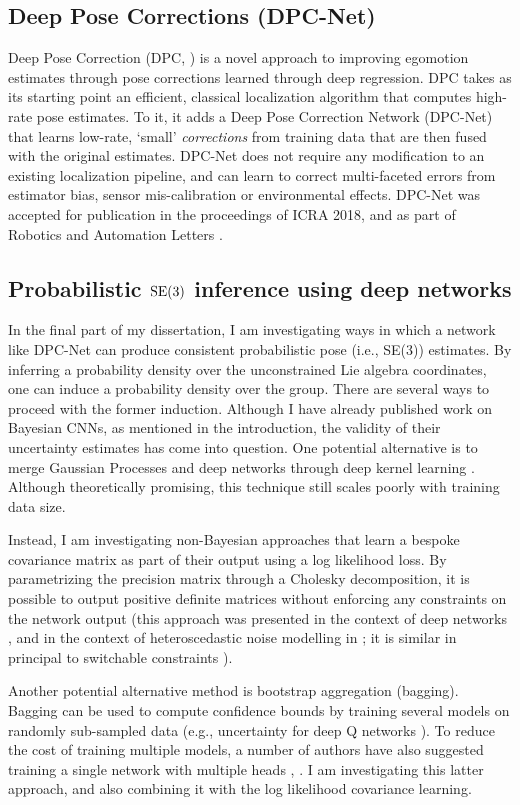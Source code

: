 \subsection{Deep Pose Corrections (DPC-Net)}
Deep Pose Correction (DPC, ) is a novel approach to improving egomotion estimates through pose corrections learned through deep regression. DPC takes as its starting point an efficient, classical localization algorithm that computes high-rate pose estimates. To it, it adds a Deep Pose Correction Network (DPC-Net) that learns low-rate, `small' \textit{corrections} from training data that are then fused with the original estimates. DPC-Net does not require any modification to an existing localization pipeline, and can learn to correct multi-faceted errors from estimator bias, sensor mis-calibration or environmental effects. DPC-Net was accepted for publication in the proceedings of ICRA 2018, and as part of Robotics and Automation Letters \citep{2018_Peretroukhin_Deep}.

\subsection{Probabilistic $\mathrm{SE}(3)$ inference using deep networks}

In the final part of my dissertation, I am investigating ways in which a network like DPC-Net can produce consistent probabilistic pose (i.e., SE(3)) estimates. By inferring a probability density over the unconstrained Lie algebra coordinates, one can induce a probability density over the group. There are several ways to proceed with the former induction.  Although I have already published work on Bayesian CNNs, as mentioned in the introduction, the validity of their uncertainty estimates has come into question. One potential alternative is to merge Gaussian Processes and deep networks through deep kernel learning \citep{Wilson2016-vy}. Although theoretically promising, this technique still scales poorly with training data size.

 Instead, I am investigating non-Bayesian approaches that learn a bespoke covariance matrix as part of their output using a log likelihood loss. By parametrizing the precision matrix through a Cholesky decomposition, it is possible to output positive definite matrices without enforcing any constraints on the network output (this approach was presented in the context of deep networks \citep{Haarnoja2016-ph}, and in the context of heteroscedastic noise modelling in \citep{Hu2015-uw}; it is similar in principal to switchable constraints \citep{Agarwal2013-jq}).
 
 Another potential alternative method is bootstrap aggregation (bagging). Bagging can be used to compute confidence bounds by training several models on randomly sub-sampled data (e.g., uncertainty for deep Q networks \citep{Osband2016-jg}). To reduce the cost of training multiple models, a number of authors have also suggested training a single network with multiple heads \citep{Lee2015-af}, \citep{Lakshminarayanan2016-zh}. I am investigating this latter approach, and also combining it with the log likelihood covariance learning.

